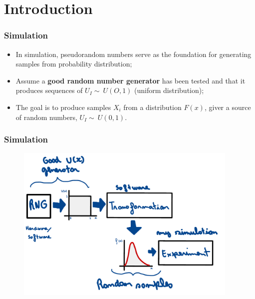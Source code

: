 


\section{Introduction}

\begin{frame}
    \frametitle{Simulation}

    \begin{itemize}

        \item In simulation, pseudorandom numbers serve as the foundation for
        generating samples from probability distribution;

        \item Assume a \textbf{good random number generator} has been tested and that it 
        produces sequences of $U_I\sim~U(O,1)$ (uniform distribution);

        \item The goal is to produce samples $X_i$ from a distribution $F(x)$,
        giver a source of random numbers, $U_I\sim~U(0,1)$.

    \end{itemize}

\end{frame}


\begin{frame}
    \frametitle{Simulation}
    \begin{figure}
        \centering
        \includegraphics[width=0.95\textwidth]{sections/introduction/figures/simulation_framework.pdf}
    \end{figure}
\end{frame}



